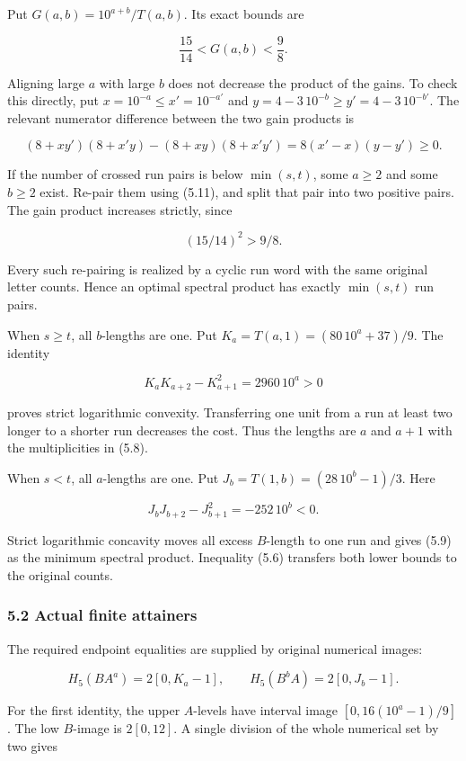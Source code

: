 Put \(G(a,b)=10^{a+b}/T(a,b)\). Its exact bounds are

\[
\frac{15}{14}<G(a,b)<\frac98.
\tag{5.10}
\]

Aligning large \(a\) with large \(b\) does not decrease the product of the gains. To check this directly, put \(x=10^{-a}\le x'=10^{-a'}\) and \(y=4-3\,10^{-b}\ge y'=4-3\,10^{-b'}\). The relevant numerator difference between the two gain products is

\[
(8+xy')(8+x'y)-(8+xy)(8+x'y')
=8(x'-x)(y-y')\ge0.
\tag{5.11}
\]

If the number of crossed run pairs is below \(\min(s,t)\), some \(a\ge2\) and some \(b\ge2\) exist. Re-pair them using (5.11), and split that pair into two positive pairs. The gain product increases strictly, since

\[
(15/14)^2>9/8.
\]

Every such re-pairing is realized by a cyclic run word with the same original letter counts. Hence an optimal spectral product has exactly \(\min(s,t)\) run pairs.

When \(s\ge t\), all \(b\)-lengths are one. Put \(K_a=T(a,1)=(80\,10^a+37)/9\). The identity

\[
K_aK_{a+2}-K_{a+1}^2=2960\,10^a>0
\tag{5.12}
\]

proves strict logarithmic convexity. Transferring one unit from a run at least two longer to a shorter run decreases the cost. Thus the lengths are \(a\) and \(a+1\) with the multiplicities in (5.8).

When \(s<t\), all \(a\)-lengths are one. Put \(J_b=T(1,b)=(28\,10^b-1)/3\). Here

\[
J_bJ_{b+2}-J_{b+1}^2=-252\,10^b<0.
\tag{5.13}
\]

Strict logarithmic concavity moves all excess \(B\)-length to one run and gives (5.9) as the minimum spectral product. Inequality (5.6) transfers both lower bounds to the original counts.

\subsubsection{5.2 Actual finite attainers}\label{eporig:actual-finite-attainers}

The required endpoint equalities are supplied by original numerical images:

\[
H_5(BA^a)=2[0,K_a-1],\qquad
H_5(B^bA)=2[0,J_b-1].
\tag{5.14}
\]

For the first identity, the upper \(A\)-levels have interval image \([0,16(10^a-1)/9]\). The low \(B\)-image is \(2[0,12]\). A single division of the whole numerical set by two gives

